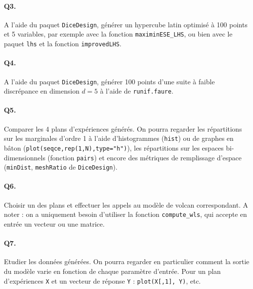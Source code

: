 \documentclass[12pt]{scrartcl}
\begin{document}
\paragraph{Q3.} A l'aide du paquet \texttt{DiceDesign}, générer un hypercube latin optimisé à 100 points et 5 variables, par exemple avec la fonction \texttt{maximinESE\_LHS}, ou bien avec le paquet \texttt{lhs} et la fonction \texttt{improvedLHS}.

\paragraph{Q4.} A l'aide du paquet \texttt{DiceDesign}, générer 100 points d'une suite à faible discrépance en dimension $d=5$ à l'aide de \texttt{runif.faure}.

\paragraph{Q5.} Comparer les 4 plans d'expériences générés. 
On pourra regarder les répartitions sur les marginales d'ordre 1 à l'aide d'histogrammes (\texttt{hist}) ou de graphes en bâton (\texttt{plot(seqce,rep(1,N),type="h")}), 
les répartitions sur les espaces bi-dimensionnels (fonction \texttt{pairs}) et encore des métriques de remplissage d'espace (\texttt{minDist}, \texttt{meshRatio} de \texttt{DiceDesign}).

\paragraph{Q6.} Choisir un des plans et effectuer les appels au modèle de volcan correspondant. A noter : on a uniquement besoin d'utiliser la fonction \texttt{compute\_wls}, qui accepte en entrée un vecteur ou une matrice.

\paragraph{Q7.} Etudier les données générées. On pourra regarder en particulier comment la sortie du modèle varie en fonction de chaque paramètre d'entrée. 
Pour un plan d'expériences \texttt{X} et un vecteur de réponse \texttt{Y} :
\texttt{plot(X[,1], Y)}, etc.
\end{document}
